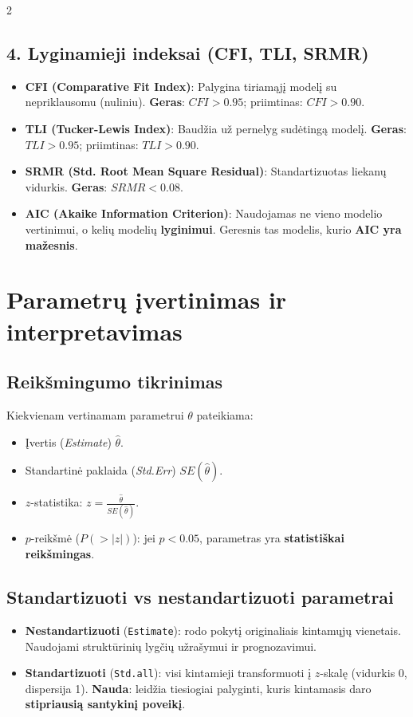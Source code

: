 \documentclass[9pt,a4paper]{article}
\begin{document}
\begin{multicols*}{2}
\subsection{4. Lyginamieji indeksai (CFI, TLI, SRMR)}
\begin{itemize}
    \item \textbf{CFI (Comparative Fit Index)}:
    Palygina tiriamąjį modelį su nepriklausomu (nuliniu).
    \textbf{Geras}: $CFI > 0.95$; priimtinas: $CFI > 0.90$.
    \item \textbf{TLI (Tucker-Lewis Index)}:
    Baudžia už pernelyg sudėtingą modelį.
    \textbf{Geras}: $TLI > 0.95$; priimtinas: $TLI > 0.90$.
    \item \textbf{SRMR (Std. Root Mean Square Residual)}:
    Standartizuotas liekanų vidurkis.
    \textbf{Geras}: $SRMR < 0.08$.
    \item \textbf{AIC (Akaike Information Criterion)}:
    Naudojamas ne vieno modelio vertinimui, o kelių modelių \textbf{lyginimui}. Geresnis tas modelis, kurio \textbf{AIC yra mažesnis}.
\end{itemize}

\section{Parametrų įvertinimas ir interpretavimas}

\subsection{Reikšmingumo tikrinimas}
Kiekvienam vertinamam parametrui $\theta$ pateikiama:
\begin{itemize}
    \item Įvertis (\textit{Estimate}) $\hat{\theta}$.
    \item Standartinė paklaida (\textit{Std.Err}) $SE(\hat{\theta})$.
    \item $z$-statistika: $z = \frac{\hat{\theta}}{SE(\hat{\theta})}$.
    \item $p$-reikšmė ($P(>|z|)$): jei $p < 0.05$, parametras yra \textbf{statistiškai reikšmingas}.
\end{itemize}

\subsection{Standartizuoti vs nestandartizuoti parametrai}
\begin{itemize}
    \item \textbf{Nestandartizuoti} (\texttt{Estimate}): rodo pokytį originaliais kintamųjų vienetais. Naudojami struktūrinių lygčių užrašymui ir prognozavimui.
    \item \textbf{Standartizuoti} (\texttt{Std.all}): visi kintamieji transformuoti į $z$-skalę (vidurkis 0, dispersija 1).
    \textbf{Nauda}: leidžia tiesiogiai palyginti, kuris kintamasis daro \textbf{stipriausią santykinį poveikį}.
\end{itemize}


\end{multicols*}
\end{document}
